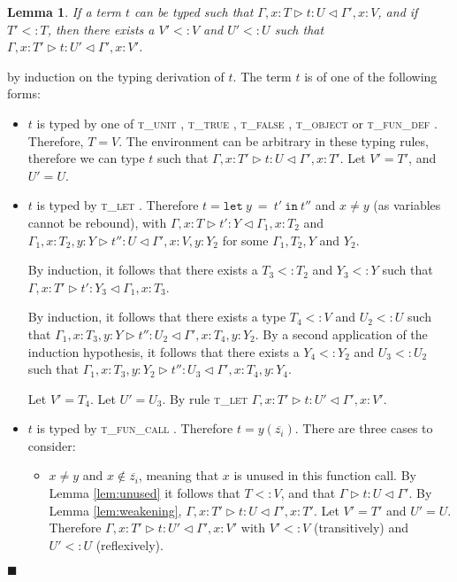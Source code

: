 \documentclass[preprint]{sigplanconf}
\newtheorem{lem}{Lemma}
\newcommand{\lemref}[1]{Lemma \ref{#1}}
\newcommand{\tunit}{\textsc{t\_unit} }
\newcommand{\ttrue}{\textsc{t\_true} }
\newcommand{\tfalse}{\textsc{t\_false} }
\newcommand{\tobj}{\textsc{t\_object} }
\newcommand{\tfundef}{\textsc{t\_fun\_def} }
\newcommand{\tlet}{\textsc{t\_let} }
\newcommand{\tfunc}{\textsc{t\_fun\_call} }
\newcommand{\typerule}[4]{#1 \triangleright #2 : #3 \triangleleft #4}
\newcommand{\lett}[3]{\mathtt{let}\:#1\:\mathtt{=}\:#2\:\mathtt{in}\:#3}
\newcommand{\qed}{$\blacksquare$}
\newenvironment{proof}{\vspace{1ex}\noindent{\bf Proof}\hspace{0.5em}}
  {\hfill\qed\vspace{1ex}}
\begin{document}

\begin{lem}
\label{lem:upgrade}
If a term $t$ can be typed such that 
$\typerule{\Gamma, x : T}{t}{U}{\Gamma', x : V}$, and if
$T' <: T$, then there exists a $V' <: V$
and $U' <: U$
such that $\typerule{\Gamma, x : T'}{t}{U'}{\Gamma', x : V'}$.
\end{lem}
\begin{proof}
by induction on the typing derivation of $t$.
The term $t$ is of one of the following forms:

\begin{itemize}
\item $t$ is typed by one of \tunit, \ttrue, \tfalse, \tobj or \tfundef.
Therefore, $T = V$.
The environment can be arbitrary in these typing rules,
therefore we can type $t$ such that 
$\typerule{\Gamma, x : T'}{t}{U}{\Gamma', x : T'}$.
Let $V' = T'$, and $U' = U$.

\item $t$ is typed by \tlet. Therefore $t = \lett{y}{t'}{t''}$ and
$x \neq y$ (as variables cannot be rebound), with
$\typerule{\Gamma, x : T}{t'}{Y}{\Gamma_1, x : T_2}$ and
$\typerule{\Gamma_1, x : T_2, y : Y}{t''}{U}{\Gamma', x : V, y : Y_2}$
for some $\Gamma_1, T_2, Y$ and $Y_2$.

By induction, it follows that there exists a $T_3 <: T_2$ 
and $Y_3 <: Y$
such that
$\typerule{\Gamma, x : T'}{t'}{Y_3}{\Gamma_1, x : T_3}$.

By induction, it follows that there exists a type $T_4 <: V$
and $U_2 <: U$
such that
$\typerule{\Gamma_1, x : T_3, y : Y}{t''}{U_2}{\Gamma', x : T_4, y : Y_2}$.
By a second application of the induction hypothesis, it follows that there
exists a $Y_4 <: Y_2$
and $U_3 <: U_2$ such that
$\typerule{\Gamma_1, x : T_3, y : Y_2}{t''}{U_3}{\Gamma', x : T_4, y : Y_4}$.

Let $V' = T_4$. Let $U' = U_3$. By rule \tlet
$\typerule{\Gamma, x : T'}{t}{U'}{\Gamma', x : V'}$.


\item $t$ is typed by \tfunc. Therefore $t = y ( \overline{z_i} )$.
There are three cases to consider:

\begin{itemize}
	\item $x \neq y$ and $x \notin \overline{z_i}$, meaning that
	$x$ is unused in this function call. By \lemref{lem:unused}
	it follows that $T <: V$, and that
	$\typerule{\Gamma}{t}{U}{\Gamma'}$.
	By \lemref{lem:weakening},
	$\typerule{\Gamma, x : T'}{t}{U}{\Gamma', x : T'}$.
	Let $V' = T'$ and $U' = U$.
	Therefore
	$\typerule{\Gamma, x : T'}{t}{U'}{\Gamma', x : V'}$
	with $V' <: V$ (transitively) and $U' <: U$ (reflexively).


\end{itemize}
\end{itemize}
\end{proof}
\end{document}
